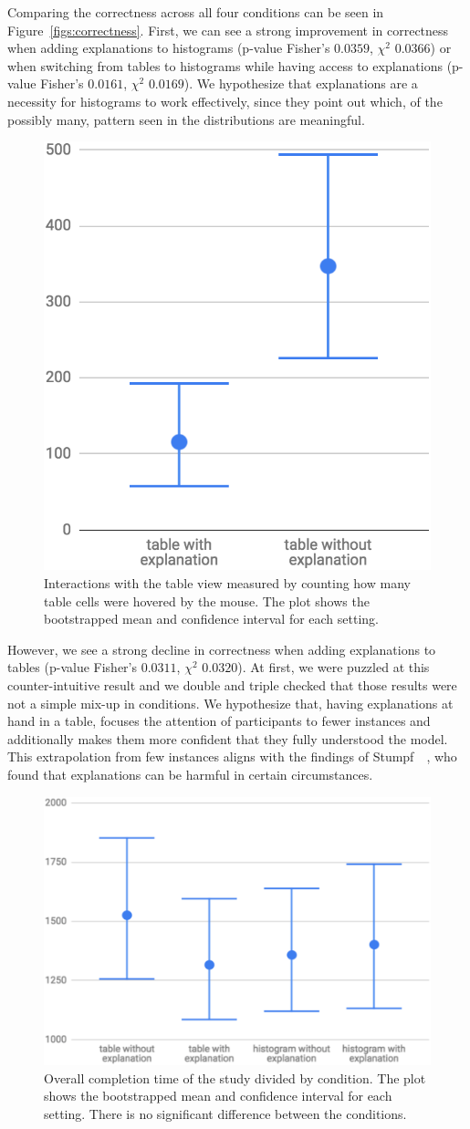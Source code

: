 Comparing the correctness across all four conditions can be seen in Figure~\ref{figs:correctness}.
First, we can see a strong improvement in correctness when adding explanations to histograms (p-value Fisher's $0.0359$, $\chi^2$ $0.0366$) or when switching from tables to histograms while having access to explanations (p-value Fisher's $0.0161$, $\chi^2$ $0.0169$).
We hypothesize that explanations are a necessity for histograms to work effectively, since they point out which, of the possibly many, pattern seen in the distributions are meaningful.

\begin{figure}[t]
\centering
\includegraphics[width=0.25\linewidth]{aggexplain/table_interaction}
\caption[Interactions with the table view.]{
Interactions with the table view measured by counting how many table cells were hovered by the mouse.
The plot shows the bootstrapped mean and confidence interval for each setting.
}
\label{figs:table_interaction}
\end{figure}

However, we see a strong decline in correctness when adding explanations to tables (p-value Fisher's $0.0311$, $\chi^2$ $0.0320$).
At first, we were puzzled at this counter-intuitive result and we double and triple checked that those results were not a simple mix-up in conditions.
We hypothesize that, having explanations at hand in a table, focuses the attention of participants to fewer instances and additionally makes them more confident that they fully understood the model.
This extrapolation from few instances aligns with the findings of Stumpf~\etal~\cite{harmful}, who found that explanations can be harmful in certain circumstances.

\begin{figure}
\centering
\includegraphics[width=0.4\linewidth]{aggexplain/timing2}
\caption[Overall completion time of the study divided by condition.]{
Overall completion time of the study divided by condition.
The plot shows the bootstrapped mean and confidence interval for each setting.
There is no significant difference between the conditions.
}
\label{figs:timing}
\end{figure}

